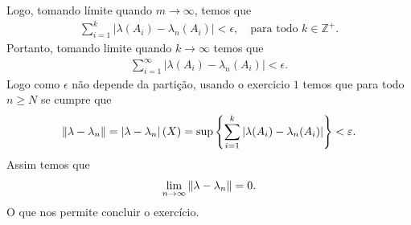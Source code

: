 \begin{homeworkProblem}[2]
\begin{solution}
\begin{enumerate}[a)]
      Logo, tomando límite quando $m\to\infty$, temos que
      \begin{align*}
        \sum_{i=1}^{k}\left| \lambda(A_i)-\lambda_{n}(A_i) \right|<\epsilon,\quad\text{para todo }k\in\mathbb{Z}^{+}.
      \end{align*}
      Portanto, tomando limite quando $k\to\infty$ temos que
      \begin{align*}
        \sum_{i=1}^{\infty}\left| \lambda(A_i)-\lambda_{n}(A_i) \right|<\epsilon.
      \end{align*}
      Logo como $\epsilon$ não depende da partição, usando o exercicio $1$ temos que para todo $n\geq N$ se cumpre que 
      \begin{align*}
        \left\|\lambda-\lambda_n\right\|=\left| \lambda-\lambda_n \right|(X)=\sup\left\{\sum_{i=1}^{k}\left| \lambda(A_i)-\lambda_{n}(A_i)\right| \right\}<\varepsilon.
      \end{align*}
      Assim temos que
      \begin{align*}
        \lim_{n \to \infty}\left\|\lambda-\lambda_n\right\|=0.
      \end{align*}
      O que nos permite concluir o exercício.
  \end{enumerate} 
  \end{solution}
\end{homeworkProblem}
